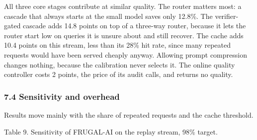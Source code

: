 \documentclass[
  10pt,
]{article}
\begin{document}
All three core stages contribute at similar quality. The router matters
most: a cascade that always starts at the small model saves only 12.8\%.
The verifier-gated cascade adds 14.8 points on top of a three-way
router, because it lets the router start low on queries it is unsure
about and still recover. The cache adds 10.4 points on this stream, less
than its 28\% hit rate, since many repeated requests would have been
served cheaply anyway. Allowing prompt compression changes nothing,
because the calibration never selects it. The online quality controller
costs 2 points, the price of its audit calls, and returns no quality.

\subsubsection{7.4 Sensitivity and
overhead}\label{sensitivity-and-overhead}

Results move mainly with the share of repeated requests and the cache
threshold.

Table 9. Sensitivity of FRUGAL-AI on the replay stream, 98\% target.
\end{document}
